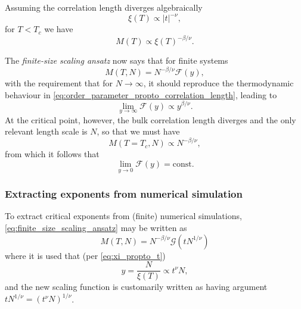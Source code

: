Assuming the correlation length diverges algebraically
\begin{equation}\label{eq:xi_propto_t}
  \xi(T) \propto |t|^{-\nu},
\end{equation}
for $T < T_c$ we have
\begin{equation}\label{eq:order_parameter_propto_correlation_length}
  M(T) \propto \xi(T)^{-\beta / \nu}.
\end{equation}

The \emph{finite-size scaling ansatz} now says that for finite systems
\begin{equation}\label{eq:finite_size_scaling_ansatz}
  M(T, N) = N^{-\beta/\nu}\mathcal{F}(y),
\end{equation}
with the requirement that for $N \to \infty$, it should reproduce the thermodynamic behaviour
in \autoref{eq:order_parameter_propto_correlation_length}, leading to
\begin{equation}
  \lim_{y \to \infty} \mathcal{F}(y) \propto y^{\beta/\nu}.
\end{equation}
At the critical point, however, the bulk correlation length diverges and the only relevant length scale is $N$,
so that we must have
\begin{equation}
  M(T = T_c, N) \propto N^{-\beta / \nu},
\end{equation}
from which it follows that
\begin{equation}
  \lim_{y \to 0} \mathcal{F}(y) = \text{const}.
\end{equation}

\subsubsection{Extracting exponents from numerical simulation}\label{sec:extracting_exponents_from_numerical_simulation}

To extract critical exponents from (finite) numerical simulations, \autoref{eq:finite_size_scaling_ansatz} may be
written as
\begin{equation}\label{eq:finite_size_scaling_ansatz_tN}
  M(T, N) = N^{-\beta/\nu} \mathcal{G}(t N^{1/\nu})
\end{equation}
where it is used that (per \autoref{eq:xi_propto_t})
\begin{equation}
  y = \frac{N}{\xi(T)} \propto t^{\nu} N,
\end{equation}
and the new scaling function is customarily written as having argument $t N^{1/\nu} = (t^{\nu} N)^{1/\nu}$.

